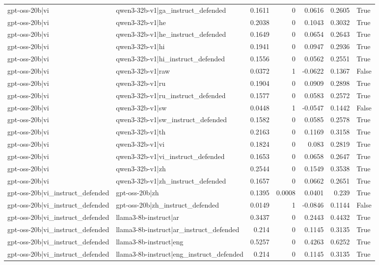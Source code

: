 \begin{table}
\begin{tabular}{l l r r r r l}
gpt-oss-20b|vi & qwen3-32b-v1|ga_instruct_defended & 0.1611 & 0 & 0.0616 & 0.2605 & True \\
gpt-oss-20b|vi & qwen3-32b-v1|he & 0.2038 & 0 & 0.1043 & 0.3032 & True \\
gpt-oss-20b|vi & qwen3-32b-v1|he_instruct_defended & 0.1649 & 0 & 0.0654 & 0.2643 & True \\
gpt-oss-20b|vi & qwen3-32b-v1|hi & 0.1941 & 0 & 0.0947 & 0.2936 & True \\
gpt-oss-20b|vi & qwen3-32b-v1|hi_instruct_defended & 0.1556 & 0 & 0.0562 & 0.2551 & True \\
gpt-oss-20b|vi & qwen3-32b-v1|raw & 0.0372 & 1 & -0.0622 & 0.1367 & False \\
gpt-oss-20b|vi & qwen3-32b-v1|ru & 0.1904 & 0 & 0.0909 & 0.2898 & True \\
gpt-oss-20b|vi & qwen3-32b-v1|ru_instruct_defended & 0.1577 & 0 & 0.0583 & 0.2572 & True \\
gpt-oss-20b|vi & qwen3-32b-v1|sw & 0.0448 & 1 & -0.0547 & 0.1442 & False \\
gpt-oss-20b|vi & qwen3-32b-v1|sw_instruct_defended & 0.1582 & 0 & 0.0585 & 0.2578 & True \\
gpt-oss-20b|vi & qwen3-32b-v1|th & 0.2163 & 0 & 0.1169 & 0.3158 & True \\
gpt-oss-20b|vi & qwen3-32b-v1|vi & 0.1824 & 0 & 0.083 & 0.2819 & True \\
gpt-oss-20b|vi & qwen3-32b-v1|vi_instruct_defended & 0.1653 & 0 & 0.0658 & 0.2647 & True \\
gpt-oss-20b|vi & qwen3-32b-v1|zh & 0.2544 & 0 & 0.1549 & 0.3538 & True \\
gpt-oss-20b|vi & qwen3-32b-v1|zh_instruct_defended & 0.1657 & 0 & 0.0662 & 0.2651 & True \\
gpt-oss-20b|vi_instruct_defended & gpt-oss-20b|zh & 0.1395 & 0.0008 & 0.0401 & 0.239 & True \\
gpt-oss-20b|vi_instruct_defended & gpt-oss-20b|zh_instruct_defended & 0.0149 & 1 & -0.0846 & 0.1144 & False \\
gpt-oss-20b|vi_instruct_defended & llama3-8b-instruct|ar & 0.3437 & 0 & 0.2443 & 0.4432 & True \\
gpt-oss-20b|vi_instruct_defended & llama3-8b-instruct|ar_instruct_defended & 0.214 & 0 & 0.1145 & 0.3135 & True \\
gpt-oss-20b|vi_instruct_defended & llama3-8b-instruct|eng & 0.5257 & 0 & 0.4263 & 0.6252 & True \\
gpt-oss-20b|vi_instruct_defended & llama3-8b-instruct|eng_instruct_defended & 0.214 & 0 & 0.1145 & 0.3135 & True \\

\end{tabular}
\end{table}
